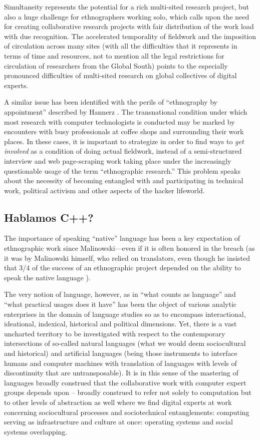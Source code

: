 \documentclass[10pt,letter,oneside]{scrartcl}
\begin{document}
Simultaneity represents the potential for a rich multi-sited
research project, but also a huge challenge for ethnographers working
solo, which calls upon the need for creating collaborative research
projects with fair distribution of the work load with due recognition.
The accelerated temporality of fieldwork and the imposition of
circulation across many sites (with all the difficulties that it
represents in terms of time and resources, not to mention all the
legal restrictions for circulation of researchers from the Global
South) points to the especially pronounced difficulties of multi-sited
research on global collectives of digital experts.

A similar issue has been identified with the perils of ``ethnography
by appointment'' described by Hannerz \cite{Hannerz-Appt}. The
transnational condition \cite{Ribeiro1994} under which most research
with computer technologists is conducted may be marked by encounters
with busy professionals at coffee shops and surrounding their work
places. In these cases, it is important to strategize in order to find
ways to \emph{get involved} as a condition of doing actual fieldwork,
instead of a semi-structured interview and web page-scraping work
taking place under the increasingly questionable usage of the term
``ethnographic research.'' This problem speaks about the necessity of
becoming entangled with and participating in technical work, political
activism and other aspects of the hacker lifeworld.


\subsection*{Hablamos C++?}

The importance of speaking ``native'' language has been a key
expectation of ethnographic work since Malinowski---even if it is
often honored in the breach (as it was by Malinowski himself, who
relied on translators, even though he insisted that 3/4 of the 
success of an ethnographic project depended on the ability to 
speak the native language \cite{Young199x-Biography}).
 
The very notion of language, however, as in ``what counts as
language'' and ``what practical usages does it have'' has been the
object of various analytic enterprises in the domain of language
studies so as to encompass interactional, ideational, indexical,
historical and political dimensions. Yet, there is a vast uncharted 
territory to be investigated with respect to the contemporary 
intersections of so-called natural languages (what we would 
deem sociocultural and historical) and artificial languages 
(being those instruments to interface humans and computer machines
with translation of languages with levels of discontinuity that are
untransposable). It is in this sense of the mastering of languages 
broadly construed that the collaborative work with computer expert 
groups depends upon -- broadly construed to refer not solely to 
computation but to other levels of abstraction as well where 
we find digital experts at work concerning sociocultural processes
and sociotechnical entanglements: computing serving as infrastructure 
and culture at once: operating systems and social systems overlapping. 
\end{document}
